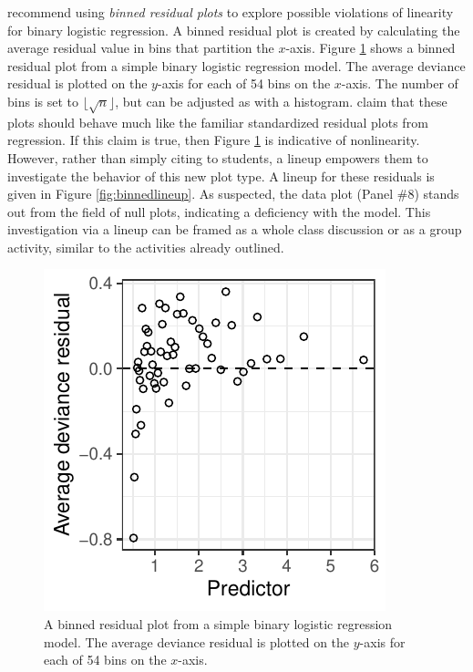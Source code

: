 \documentclass[12pt]{article}
\begin{document}
\citet{GelmanHill:2007} recommend using \emph{binned residual plots} to
explore possible violations of linearity for binary logistic regression.
A binned residual plot is created by calculating the average residual
value in bins that partition the \(x\)-axis. Figure \ref{fig:binned}
shows a binned residual plot from a simple binary logistic regression
model. The average deviance residual is plotted on the \(y\)-axis for
each of 54 bins on the \(x\)-axis. The number of bins is set to
\(\lfloor \sqrt{n} \rfloor\), but can be adjusted as with a histogram.
\citet{GelmanHill:2007} claim that these plots should behave much like
the familiar standardized residual plots from regression. If this claim
is true, then Figure \ref{fig:binned} is indicative of nonlinearity.
However, rather than simply citing \citet{GelmanHill:2007} to students,
a lineup empowers them to investigate the behavior of this new plot
type. A lineup for these residuals is given in Figure
\ref{fig:binnedlineup}. As suspected, the data plot (Panel \#8) stands
out from the field of null plots, indicating a deficiency with the
model. This investigation via a lineup can be framed as a whole class
discussion or as a group activity, similar to the activities already
outlined.

\begin{figure}
\centering
\includegraphics{figs/binned_resid_example.pdf}
\caption{\label{fig:binned} A binned residual plot from a simple binary
logistic regression model. The average deviance residual is plotted on
the \(y\)-axis for each of 54 bins on the \(x\)-axis.}
\end{figure}
\end{document}
